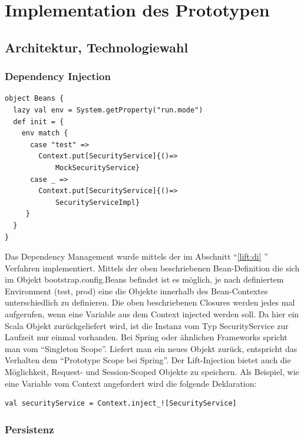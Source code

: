 \chapter{Implementation des Prototypen}\label{implementation}

\section{Architektur, Technologiewahl}
\subsection{Dependency Injection}\label{implementation:di}

\begin{lstlisting}[caption=Abh\"angigkeiten abh\"angig von der Umgebung]
object Beans {
  lazy val env = System.getProperty("run.mode")
  def init = {
    env match {
      case "test" =>
        Context.put[SecurityService]{()=>
            MockSecurityService}
      case _ =>
        Context.put[SecurityService]{()=>
            SecurityServiceImpl}
     }
  }
}
\end{lstlisting}
Das Dependency Management wurde mittels der im Abschnitt ``\ref{lift:di} '' Verfahren implementiert. Mittels der oben beschriebenen Bean-Definition die sich im Objekt bootstrap.config.Beans befindet ist es m\"oglich, je nach definiertem Environment (test, prod) eine die Objekte innerhalb des Bean-Contextes unterschiedlich zu definieren. Die oben beschriebenen Closures werden jedes mal aufgerufen, wenn eine Variable aus dem Context injected werden soll. Da hier ein Scala Objekt zur\"uckgeliefert wird, ist die Instanz vom Typ SecurityService zur Laufzeit nur einmal vorhanden. Bei Spring oder \"ahnlichen Frameworks spricht man vom ``Singleton Scope''. Liefert man ein neues Objekt zur\"uck, entspricht das Verhalten dem ``Prototype Scope bei Spring''. Der Lift-Injection bietet auch die M\"oglichkeit, Request- und Session-Scoped Objekte zu speichern. Als Beispiel, wie eine Variable vom Context angefordert wird die folgende Deklaration:

\begin{lstlisting}[caption=Anfrage einer Variable aus dem Lift Bean Context]
val securityService = Context.inject_![SecurityService]
\end{lstlisting}


\subsection{Persistenz}
